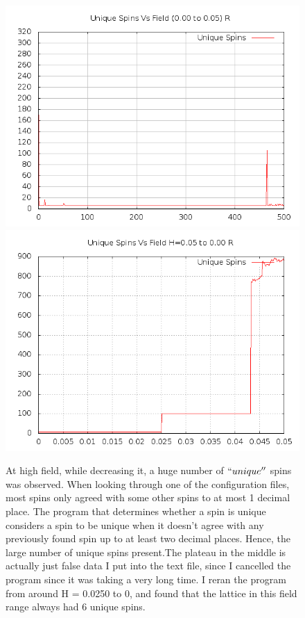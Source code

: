 \documentclass{article}
\begin{document}
\begin{figure}[ht]
\centering
\includegraphics[scale=0.5]{100/000to005RFreq.png}
\includegraphics[scale=0.5]{100/005to000RFreq.png}
\caption{At high field, while decreasing it, a huge number of $``unique''$ spins was observed. When looking through one of the configuration
files, most spins only agreed with some other spins to at most 1 decimal place. The program that determines whether
a spin is unique considers a spin to be unique when it doesn't agree with any previously found spin up to at least two decimal 
places. Hence, the large number of unique spins present.The plateau in the middle is actually just false data I put
into the text file, since I cancelled the program since it was taking a very long time. I reran the program from around
H = 0.0250 to 0, and found that the lattice in this field range always had 6 unique spins.}
\end{figure}
\clearpage
\end{document}
